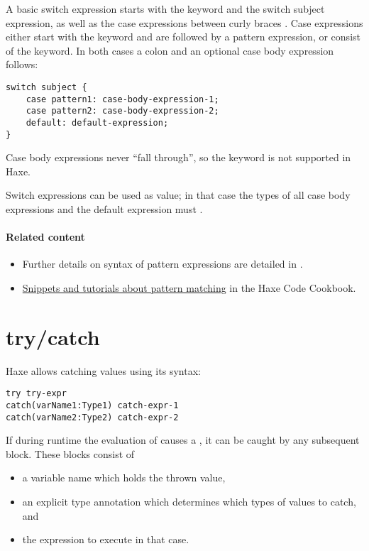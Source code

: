 A basic switch expression starts with the  keyword and the switch subject expression, as well as the case expressions between curly braces \expr{\{\}}. Case expressions either start with the  keyword and are followed by a pattern expression, or consist of the  keyword. In both cases a colon \expr{:} and an optional case body expression follows:

\begin{lstlisting}
switch subject {
	case pattern1: case-body-expression-1;
	case pattern2: case-body-expression-2;
	default: default-expression;
}
\end{lstlisting}

Case body expressions never ``fall through'', so the  keyword is not supported in Haxe.

Switch expressions can be used as value; in that case the types of all case body expressions and the default expression must .

\paragraph{Related content}
\begin{itemize}
	\item Further details on syntax of pattern expressions are detailed in .
	\item \href{http://code.haxe.org/tag/pattern-matching.html}{Snippets and tutorials about pattern matching} in the Haxe Code Cookbook.
\end{itemize}


\section{try/catch}
\label{expression-try-catch}

Haxe allows catching values using its  syntax:

\begin{lstlisting}
try try-expr
catch(varName1:Type1) catch-expr-1
catch(varName2:Type2) catch-expr-2
\end{lstlisting}

If during runtime the evaluation of  causes a , it can be caught by any subsequent  block. These blocks consist of

\begin{itemize}
	\item a variable name which holds the thrown value,
	\item an explicit type annotation which determines which types of values to catch, and
	\item the expression to execute in that case.
\end{itemize}

